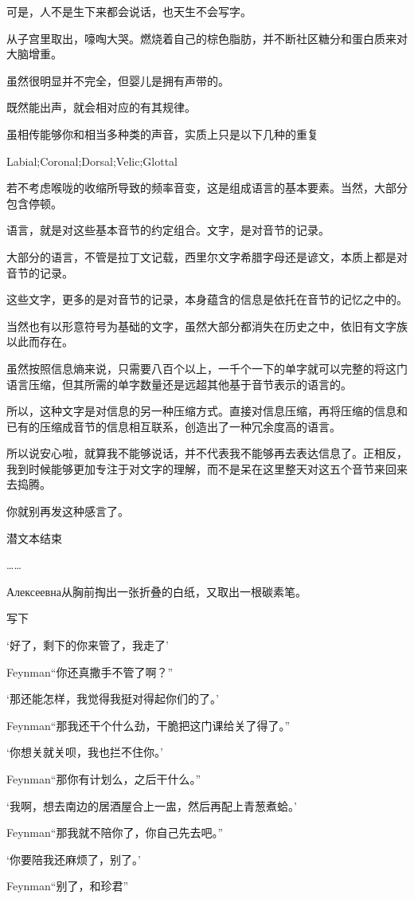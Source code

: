 \documentclass{article}
\begin{document}
可是，人不是生下来都会说话，也天生不会写字。

从子宫里取出，嚎啕大哭。燃烧着自己的棕色脂肪，并不断社区糖分和蛋白质来对大脑增重。

虽然很明显并不完全，但婴儿是拥有声带的。

既然能出声，就会相对应的有其规律。

虽相传能够你和相当多种类的声音，实质上只是以下几种的重复

Labial;Coronal;Dorsal;Velic;Glottal

若不考虑喉咙的收缩所导致的频率音变，这是组成语言的基本要素。当然，大部分包含停顿。

语言，就是对这些基本音节的约定组合。文字，是对音节的记录。

大部分的语言，不管是拉丁文记载，西里尔文字希腊字母还是谚文，本质上都是对音节的记录。

这些文字，更多的是对音节的记录，本身蕴含的信息是依托在音节的记忆之中的。

当然也有以形意符号为基础的文字，虽然大部分都消失在历史之中，依旧有文字族以此而存在。

虽然按照信息熵来说，只需要八百个以上，一千个一下的单字就可以完整的将这门语言压缩，但其所需的单字数量还是远超其他基于音节表示的语言的。

所以，这种文字是对信息的另一种压缩方式。直接对信息压缩，再将压缩的信息和已有的压缩成音节的信息相互联系，创造出了一种冗余度高的语言。

所以说安心啦，就算我不能够说话，并不代表我不能够再去表达信息了。正相反，我到时候能够更加专注于对文字的理解，而不是呆在这里整天对这五个音节来回来去捣腾。

你就别再发这种感言了。

潜文本结束

……

Алексеевна从胸前掏出一张折叠的白纸，又取出一根碳素笔。

写下

‘好了，剩下的你来管了，我走了’

Feynman“你还真撒手不管了啊？”

‘那还能怎样，我觉得我挺对得起你们的了。’

Feynman“那我还干个什么劲，干脆把这门课给关了得了。”

‘你想关就关呗，我也拦不住你。’

Feynman“那你有计划么，之后干什么。”

‘我啊，想去南边的居酒屋合上一盅，然后再配上青葱煮蛤。’

Feynman“那我就不陪你了，你自己先去吧。”

‘你要陪我还麻烦了，别了。’

Feynman“别了，和珍君”






\end{document}
